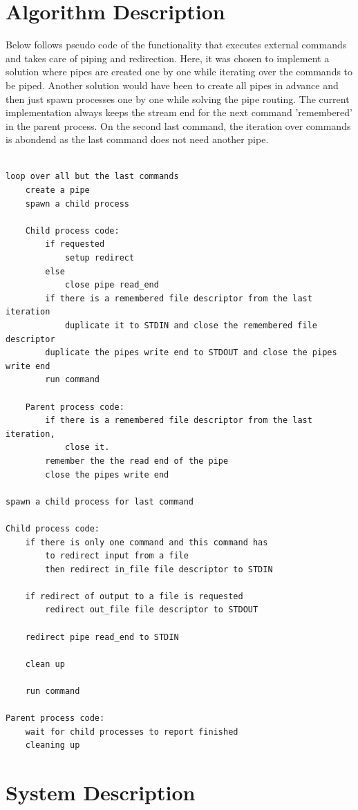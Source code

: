 \documentclass[a4paper,11pt,twoside]{article}
\begin{document}
\section{Algorithm Description}
Below follows pseudo code of the functionality that executes external commands and takes care of piping and redirection. Here, it was chosen to implement a solution where pipes are created one by one while iterating over the commands to be piped. Another solution would have been to create all pipes in advance and then just spawn processes one by one while solving the pipe routing. The current implementation always keeps the stream end for the next command 'remembered' in the parent process. On the second last command, the iteration over commands is abondend as the last command does not need another pipe. 


\begin{verbatim}

loop over all but the last commands 
    create a pipe
    spawn a child process

    Child process code:
        if requested 
            setup redirect
        else
            close pipe read_end
        if there is a remembered file descriptor from the last iteration 
            duplicate it to STDIN and close the remembered file descriptor
        duplicate the pipes write end to STDOUT and close the pipes write end
        run command

    Parent process code:
        if there is a remembered file descriptor from the last iteration,
            close it.
        remember the the read end of the pipe 
        close the pipes write end

spawn a child process for last command

Child process code:
    if there is only one command and this command has 
        to redirect input from a file
        then redirect in_file file descriptor to STDIN

    if redirect of output to a file is requested
        redirect out_file file descriptor to STDOUT

    redirect pipe read_end to STDIN

    clean up

    run command

Parent process code:
    wait for child processes to report finished
    cleaning up
\end{verbatim}


\section{System Description}
\end{document}
